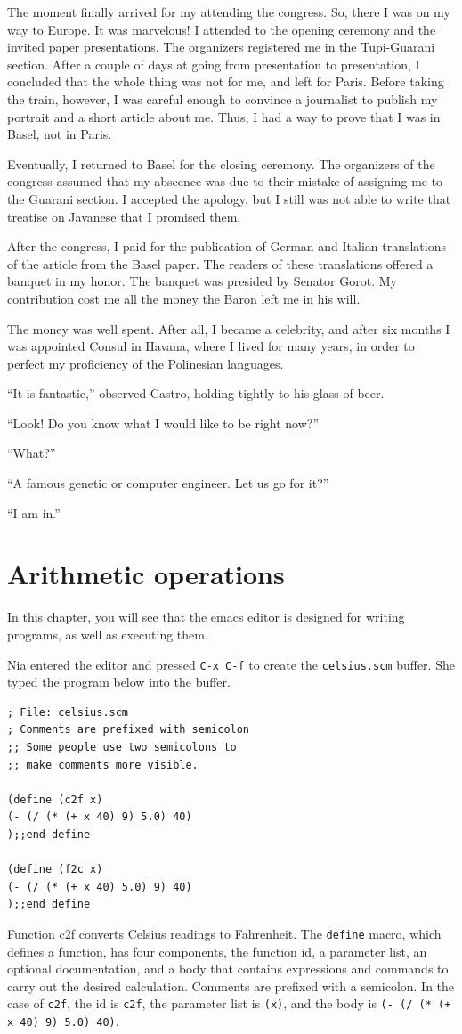 \documentclass[a4paper,12pt]{book}
\begin{document}
The moment finally arrived for my
attending the congress. So, there
I was on my way to Europe.
It was marvelous! I attended to
the opening ceremony and the invited
paper presentations. The organizers
registered me in the Tupi-Guarani
section. After a couple of days at
going from presentation to presentation,
I concluded that the whole thing was
not for me, and left for Paris.
Before taking the train, however,
I was careful enough to convince a
journalist to publish my portrait
and a short article about me. Thus,
I had a way to prove that I was in
Basel, not in Paris.

Eventually, I returned to Basel for
the closing ceremony. The organizers
of the congress assumed that my
abscence was due to their mistake
of assigning me to the Guarani section.
I accepted the apology, but I still
was not able to write that treatise
on Javanese that I promised them.

After the congress, I paid for the publication
of German and Italian translations of the article
from the Basel paper. The readers of these
translations offered a banquet in my honor.
The banquet was presided by Senator Gorot.
My contribution cost me all the money
the Baron left me in his will.

The money was well spent. After all,
I became a celebrity, and after six
months I was appointed Consul in
Havana, where I lived for many years,
in order to perfect my proficiency
of the Polinesian languages.

``It is fantastic,'' observed Castro, holding
tightly to his glass of beer.

``Look! Do you know what I would like to
be right now?''

``What?''

``A famous genetic or computer engineer. Let us
go for it?''

``I am in.''


\chapter{Arithmetic operations}
In this chapter, you will see that the emacs
editor is designed for writing programs, as
well as executing them.

Nia entered the editor and pressed \verb|C-x C-f| 
to create the \verb|celsius.scm| buffer. 
She typed the  program below into the buffer. 
\begin{verbatim}
; File: celsius.scm
; Comments are prefixed with semicolon
;; Some people use two semicolons to
;; make comments more visible.

(define (c2f x)
(- (/ (* (+ x 40) 9) 5.0) 40)
);;end define

(define (f2c x)
(- (/ (* (+ x 40) 5.0) 9) 40)
);;end define
\end{verbatim}
Function c2f converts Celsius readings to Fahrenheit.
The \verb|define| macro, which defines a function, 
has four components, the function id, a parameter list,
an optional documentation, and a body that contains
expressions and commands to carry out the desired
calculation. Comments are prefixed with a semicolon.
In the case of \verb|c2f|, the id is \verb|c2f|,
the parameter list is \verb|(x)|, and the body 
is \verb|(- (/ (* (+ x 40) 9) 5.0) 40)|.
\end{document}
